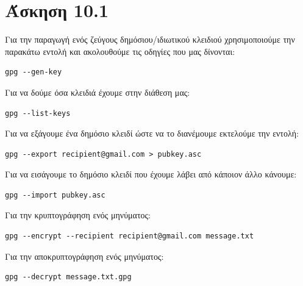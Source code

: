 \documentclass[12pt]{article}
\numberwithin{equation}{section}
\begin{document}
\section{Άσκηση 10.1}
Για την παραγωγή ενός ζεύγους δημόσιου/ιδιωτικού κλειδιού χρησιμοποιούμε την παρακάτω εντολή και ακολουθούμε τις οδηγίες που μας δίνονται:
\begin{lstlisting}
gpg --gen-key
\end{lstlisting}

Για να δούμε όσα κλειδιά έχουμε στην διάθεση μας:
\begin{lstlisting}
gpg --list-keys
\end{lstlisting}

Για να εξάγουμε ένα δημόσιο κλειδί ώστε να το διανέμουμε εκτελούμε την εντολή:
\begin{lstlisting}
gpg --export recipient@gmail.com > pubkey.asc
\end{lstlisting}

Για να εισάγουμε το δημόσιο κλειδί που έχουμε λάβει από κάποιον άλλο κάνουμε:
\begin{lstlisting}
gpg --import pubkey.asc
\end{lstlisting}

Για την κρυπτογράφηση ενός μηνύματος:
\begin{lstlisting}
gpg --encrypt --recipient recipient@gmail.com message.txt
\end{lstlisting}

Για την αποκρυπτογράφηση ενός μηνύματος:
\begin{lstlisting}
gpg --decrypt message.txt.gpg
\end{lstlisting}



\end{document}
